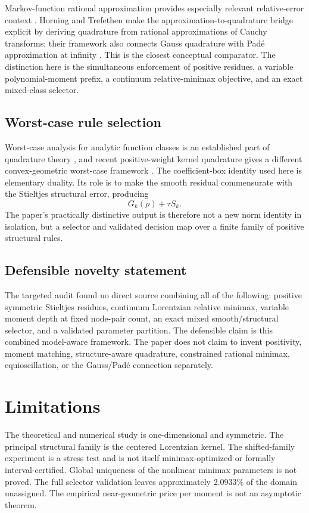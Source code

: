 \documentclass[preprint,12pt]{elsarticle}
\theoremstyle{remark}
\begin{document}
Markov-function rational approximation provides especially relevant
relative-error context \cite{beckermann2021}. Horning and Trefethen make
the approximation-to-quadrature bridge explicit by deriving quadrature
from rational approximations of Cauchy transforms; their framework also
connects Gauss quadrature with Pad\'e approximation at infinity
\cite{horning2025}. This is the closest conceptual comparator. The
distinction here is the simultaneous enforcement of positive residues,
a variable polynomial-moment prefix, a continuum relative-minimax
objective, and an exact mixed-class selector.

\subsection{Worst-case rule selection}

Worst-case analysis for analytic function classes is an established
part of quadrature theory \cite{trefethen2022,goda2024}, and recent
positive-weight kernel quadrature gives a different
convex-geometric worst-case framework \cite{hayakawa2026}. The
coefficient-box identity used here is elementary duality. Its role is
to make the smooth residual commensurate with the Stieltjes structural
error, producing
\[
G_k(\rho)+\tau S_k.
\]
The paper's practically distinctive output is therefore not a new norm
identity in isolation, but a selector and validated decision map over a
finite family of positive structural rules.

\subsection{Defensible novelty statement}

The targeted audit found no direct source combining all of the
following: positive symmetric Stieltjes residues, continuum Lorentzian
relative minimax, variable moment depth at fixed node-pair count, an
exact mixed smooth/structural selector, and a validated parameter
partition. The defensible claim is this combined model-aware framework.
The paper does not claim to invent positivity, moment matching,
structure-aware quadrature, constrained rational minimax,
equioscillation, or the Gauss/Pad\'e connection separately.

\section{Limitations}

The theoretical and numerical study is one-dimensional and symmetric.
The principal structural family is the centered Lorentzian kernel.
The shifted-family experiment is a stress test and is not itself
minimax-optimized or formally interval-certified. Global uniqueness of
the nonlinear minimax parameters is not proved. The full selector
validation leaves approximately 2.0933\% of the domain unassigned. The
empirical near-geometric price per moment is not an asymptotic theorem.
\end{document}
